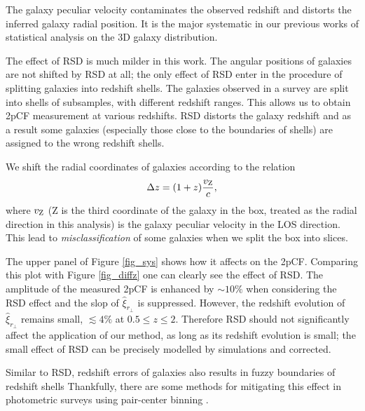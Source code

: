 \documentclass[iop]{emulateapj}
\begin{document}
The galaxy peculiar velocity contaminates the observed redshift and distorts 
the inferred galaxy radial position.
It is the major systematic in our previous works \citep{Li2014,Li2015,Li2016}
of statistical analysis on the 3D galaxy distribution.

The effect of RSD is much milder in this work. 
The angular positions of galaxies are not shifted by RSD at all;
the only effect of RSD enter in the procedure of 
splitting galaxies into redshift shells.
The galaxies observed in a survey are split into shells of subsamples, 
with different redshift ranges. This allows us to obtain 2pCF measurement at various redshifts.
RSD distorts the galaxy redshift and as a result some galaxies 
(especially those close to the boundaries of shells) are assigned to the wrong redshift shells.

We shift the radial coordinates of galaxies according to the relation 
\begin{equation}\label{eq:zvpeu}
\Delta z = (1+z) \frac{v_{{\rm Z}}}{c},
\end{equation}
where $v_{{\rm Z}}$ (Z is the third coordinate of the galaxy in the box, treated as the radial direction in this analysis) 
is the galaxy peculiar velocity in the LOS direction.
This lead to {\it misclassification} of some galaxies when we split the box into slices.

The upper panel of Figure \ref{fig_sys} shows how it affects on the 2pCF.
Comparing this plot with Figure \ref{fig_diffz} one can clearly see the effect of RSD.
The amplitude of the measured 2pCF is enhanced by $\sim 10\%$ when considering the RSD effect 
and the slop of $\hat\xi_{r_\perp}$ is suppressed.
However, the redshift evolution of $\hat\xi_{r_\perp}$ remains small,  $\lesssim4\%$ at $0.5\leq z \leq 2$.
Therefore RSD should not significantly affect the application of our method, as long as its redshift evolution is small;
the small effect of RSD can be precisely modelled by simulations and corrected.

Similar to RSD, redshift errors of galaxies
also results in fuzzy boundaries of redshift shells
Thankfully, there are some methods for mitigating this effect in photometric surveys using pair-center binning \citep{2010MNRAS.407..520N}. 
\end{document}
